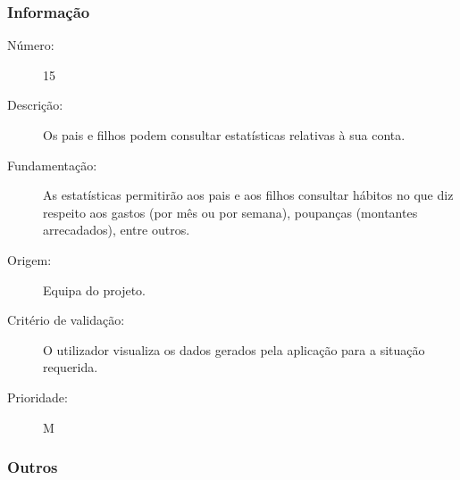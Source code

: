 \documentclass{article}
\begin{document}
    \subsubsection{Informação}

      \begin{description}
        \item[Número:]15
        \item[Descrição:]Os pais e filhos podem consultar estatísticas relativas à sua conta.
        \item[Fundamentação:]As estatísticas permitirão aos pais e aos filhos consultar hábitos no que diz respeito aos gastos (por mês ou por semana), poupanças (montantes arrecadados), entre outros.
        \item[Origem:]Equipa do projeto.
        \item[Critério de validação:] O utilizador visualiza os dados gerados pela aplicação para a situação requerida.
        \item[Prioridade:]M
      \end{description}

    \subsubsection{Outros}
\end{document}

